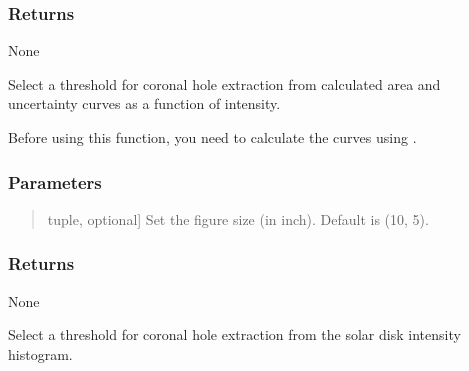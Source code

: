 \documentclass[letterpaper,10pt,english]{sphinxmanual}
\begin{document}
\begin{fulllineitems}
\begin{fulllineitems}
\subsubsection{Returns}
\label{\detokenize{pycatch/pycatch:id34}}
\sphinxAtStartPar
None

\end{fulllineitems}


\begin{fulllineitems}
\label{\detokenize{pycatch/pycatch:pycatch.pycatch.pycatch.threshold_from_curves}}
\pysigstartsignatures
{}
\pysigstopsignatures
\sphinxAtStartPar
Select a threshold for coronal hole extraction from calculated area and uncertainty curves as a function of intensity.

\sphinxAtStartPar
Before using this function, you need to calculate the curves using .


\subsubsection{Parameters}
\label{\detokenize{pycatch/pycatch:id35}}\begin{quote}
\begin{description}
\sphinxlineitem{fsize}{[}tuple, optional{]}
\sphinxAtStartPar
Set the figure size (in inch). Default is (10, 5).

\end{description}
\end{quote}


\subsubsection{Returns}
\label{\detokenize{pycatch/pycatch:id36}}
\sphinxAtStartPar
None

\end{fulllineitems}


\begin{fulllineitems}
\label{\detokenize{pycatch/pycatch:pycatch.pycatch.pycatch.threshold_from_hist}}
\pysigstartsignatures
{}
\pysigstopsignatures
\sphinxAtStartPar
Select a threshold for coronal hole extraction from the solar disk intensity histogram.



\end{fulllineitems}
\end{fulllineitems}
\end{document}
